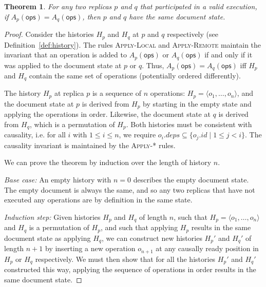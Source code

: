 \documentclass[10pt,journal,compsoc]{IEEEtran}
\newtheorem{theorem}{Theorem}
\newif\ifincludeappendix
\begin{document}
\ifincludeappendix
\clearpage
{}\label{sec:proof}

\begin{theorem}\label{thm:convergence}
For any two replicas $p$ and $q$ that participated in a valid execution, if $A_p(\mathsf{ops}) = A_q(\mathsf{ops})$, then $p$ and $q$ have the same document state.
\end{theorem}

\begin{proof}
Consider the histories $H_p$ and $H_q$ at $p$ and $q$ respectively (see Definition~\ref{def:history}). The rules \textsc{Apply-Local} and \textsc{Apply-Remote} maintain the invariant that an operation is added to $A_p(\mathsf{ops})$ or $A_q(\mathsf{ops})$ if and only if it was applied to the document state at $p$ or $q$. Thus, $A_p(\mathsf{ops}) = A_q(\mathsf{ops})$ iff $H_p$ and $H_q$ contain the same set of operations (potentially ordered differently).

The history $H_p$ at replica $p$ is a sequence of $n$ operations: $H_p = \langle o_1, \dots, o_n \rangle$, and the document state at $p$ is derived from $H_p$ by starting in the empty state and applying the operations in order. Likewise, the document state at $q$ is derived from $H_q$, which is a permutation of $H_p$. Both histories must be consistent with causality, i.e. for all $i$ with $1 \le i \le n$, we require $o_i.\mathit{deps} \subseteq \{o_j.\mathit{id} \mid 1 \le j < i\}$. The causality invariant is maintained by the \textsc{Apply-*} rules.

We can prove the theorem by induction over the length of history $n$.

\emph{Base case:} An empty history with $n=0$ describes the empty document state. The empty document is always the same, and so any two replicas that have not executed any operations are by definition in the same state.

\emph{Induction step:} Given histories $H_p$ and $H_q$ of length $n$, such that $H_p = \langle o_1, \dots, o_n \rangle$ and $H_q$ is a permutation of $H_p$, and such that applying $H_p$ results in the same document state as applying $H_q$, we can construct new histories $H_p'$ and $H_q'$ of length $n+1$ by inserting a new operation $o_{n+1}$ at any causally ready position in $H_p$ or $H_q$ respectively. We must then show that for all the histories $H_p'$ and $H_q'$ constructed this way, applying the sequence of operations in order results in the same document state.


\end{proof}
\end{document}
